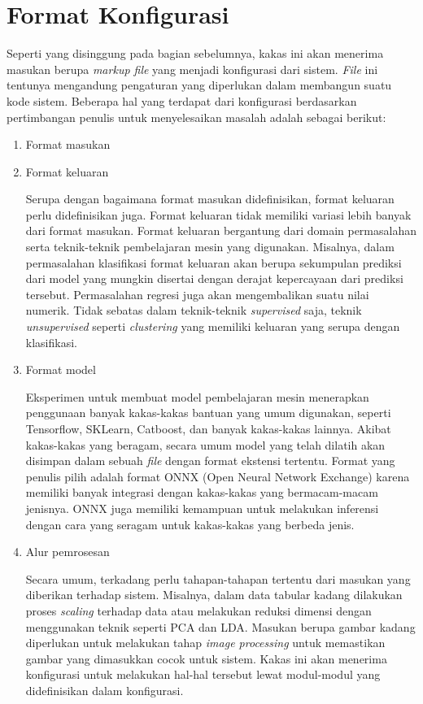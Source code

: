 \section{Format Konfigurasi}

Seperti yang disinggung pada bagian sebelumnya, kakas ini akan menerima masukan berupa \textit{markup file} yang menjadi konfigurasi dari sistem.
\textit{File} ini tentunya mengandung pengaturan yang diperlukan dalam membangun suatu kode sistem.
Beberapa hal yang terdapat dari konfigurasi berdasarkan pertimbangan penulis untuk menyelesaikan masalah adalah sebagai berikut:

\begin{enumerate}
	\item Format masukan
	\item Format keluaran
	
	Serupa dengan bagaimana format masukan didefinisikan, format keluaran perlu didefinisikan juga.
	Format keluaran tidak memiliki variasi lebih banyak dari format masukan.
	Format keluaran bergantung dari domain permasalahan serta teknik-teknik pembelajaran mesin yang digunakan.
	Misalnya, dalam permasalahan klasifikasi format keluaran akan berupa sekumpulan prediksi dari model yang mungkin disertai dengan derajat kepercayaan dari prediksi tersebut.
	Permasalahan regresi juga akan mengembalikan suatu nilai numerik.
	Tidak sebatas dalam teknik-teknik \textit{supervised} saja, teknik \textit{unsupervised} seperti \textit{clustering} yang memiliki keluaran yang serupa dengan klasifikasi.

	\item Format model
	
	Eksperimen untuk membuat model pembelajaran mesin menerapkan penggunaan banyak kakas-kakas bantuan yang umum digunakan, seperti Tensorflow, SKLearn, Catboost, dan banyak kakas-kakas lainnya.
	Akibat kakas-kakas yang beragam, secara umum model yang telah dilatih akan disimpan dalam sebuah \textit{file} dengan format ekstensi tertentu.
	Format yang penulis pilih adalah format ONNX (Open Neural Network Exchange) karena memiliki banyak integrasi dengan kakas-kakas yang bermacam-macam jenisnya.
	ONNX juga memiliki kemampuan untuk melakukan inferensi dengan cara yang seragam untuk kakas-kakas yang berbeda jenis. 

	\item Alur pemrosesan
	
	Secara umum, terkadang perlu tahapan-tahapan tertentu dari masukan yang diberikan terhadap sistem.
	Misalnya, dalam data tabular kadang dilakukan proses \textit{scaling} terhadap data atau melakukan reduksi dimensi dengan menggunakan teknik seperti PCA dan LDA.
	Masukan berupa gambar kadang diperlukan untuk melakukan tahap \textit{image processing} untuk memastikan gambar yang dimasukkan cocok untuk sistem.
	Kakas ini akan menerima konfigurasi untuk melakukan hal-hal tersebut lewat modul-modul yang didefinisikan dalam konfigurasi.


\end{enumerate}

